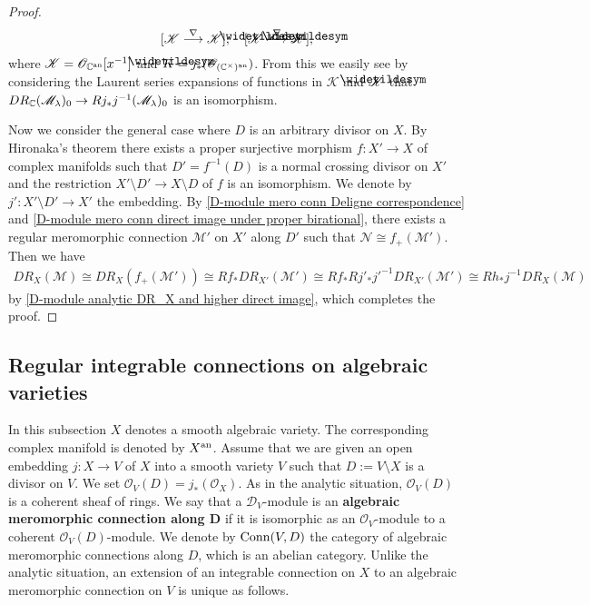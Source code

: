 \begin{proof}
\[[\mathscr{K}\stackrel{\nabla}{\longrightarrow}\mathscr{K}],\quad [\bigtilde{\mathscr{K}}\stackrel{\nabla}{\longrightarrow}\bigtilde{\mathscr{K}}],\]
where $\mathscr{K}=\mathscr{O}_{\mathbb{C}^{\mathrm{an}}}[x^{-1}]$ and $\bigtilde{K}=j_*(\mathscr{O}_{(\C^\times)^\an})$. From this we easily see by considering the Laurent series expansions of functions in $\mathscr{K}$ and $\bigtilde{\mathscr{K}}$ that $DR_{\mathbb{C}}(\mathscr{M}_\lambda)_0\to Rj_*j^{-1}(\mathscr{M}_\lambda)_0$ is an isomorphism.\par
Now we consider the general case where $D$ is an arbitrary divisor on $X$. By Hironaka's theorem there exists a proper surjective morphism $f:X'\to X$ of complex manifolds such that $D'=f^{-1}(D)$ is a normal crossing divisor on $X'$ and the restriction $X'\setminus D'\to X\setminus D$ of $f$ is an isomorphism. We denote by $j':X'\setminus D'\to X'$ the embedding. By \cref{D-module mero conn Deligne correspondence} and \cref{D-module mero conn direct image under proper birational}, there exists a regular meromorphic connection $\mathscr{M}'$ on $X'$ along $D'$ such that $\mathscr{N}\cong f_+(\mathscr{M}')$. Then we have
\begin{align*}
DR_X(\mathscr{M})\cong DR_X(f_+(\mathscr{M}'))\cong Rf_*DR_{X'}(\mathscr{M}')\cong Rf_*Rj'_*j'^{-1}DR_{X'}(\mathscr{M}')\cong Rh_*j^{-1}DR_X(\mathscr{M})
\end{align*}
by \cref{D-module analytic DR_X and higher direct image}, which completes the proof.
\end{proof}

\subsection{Regular integrable connections on algebraic varieties}
In this subsection $X$ denotes a smooth algebraic variety. The corresponding complex manifold is denoted by $X^{\mathrm{an}}$. Assume that we are given an open embedding $j:X\to V$ of $X$ into a smooth variety $V$ such that $D:=V\setminus X$ is a divisor on $V$. We set $\mathscr{O}_V(D)=j_*(\mathscr{O}_X)$. As in the analytic situation, $\mathscr{O}_V(D)$ is a coherent sheaf of rings. We say that a $\mathscr{D}_V$-module is an \textbf{algebraic meromorphic connection along $\bm{D}$} if it is isomorphic as an $\mathscr{O}_V$-module to a coherent $\mathscr{O}_V(D)$-module. We denote by $\mathrm{Conn}(V,D)$ the category of algebraic meromorphic connections along $D$, which is an abelian category. Unlike the analytic situation, an extension of an integrable connection on $X$ to an algebraic meromorphic connection on $V$ is unique as follows.

